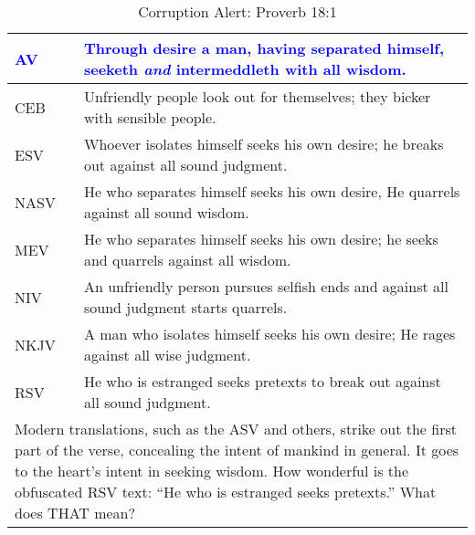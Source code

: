 \newpage
\begin{center}

\begin{table}[ht]
\centering
\begin{tabular}{|p{.5in}|p{3.5in}|}
    \hline
    \textcolor{blue}{AV} & \textcolor{blue}{Through desire a man, having separated himself, seeketh \emph{and} intermeddleth with all wisdom.}\\ \hline
    \hline
    CEB &  Unfriendly people look out for themselves; they bicker with sensible people.\\ \hline
%
ESV & Whoever isolates himself seeks his own desire;  he breaks out against all sound judgment. \\ \hline
%
NASV &  He who separates himself seeks his own desire, He quarrels against all sound wisdom.\\ \hline
%
MEV & He who separates himself seeks his own desire; he seeks and quarrels against all wisdom.\\ \hline
%
NIV &  An unfriendly person pursues selfish ends and against all sound judgment starts quarrels. \\ \hline
%
NKJV &  A man who isolates himself seeks his own desire; He rages against all wise judgment.\\ \hline
%
RSV &  He who is estranged seeks pretexts  to break out against all sound judgment.\\ \hline \hline

\multicolumn{2}{|p{4.2in}|}{{\textcolor{jungle}{Modern translations, such as the ASV and others, strike out the first part of the verse, concealing the intent of mankind in general.  It goes to the heart's intent in seeking wisdom. How wonderful is the obfuscated RSV text: ``He who is estranged seeks pretexts.'' What does THAT mean?}}} \\ \hline

\end{tabular}
\caption[Corruption Alert: Proverb 18:1]{Corruption Alert: Proverb 18:1} \label{table:Corruption Proverb 18:1}
\end{table}

\end{center}


\newpage

